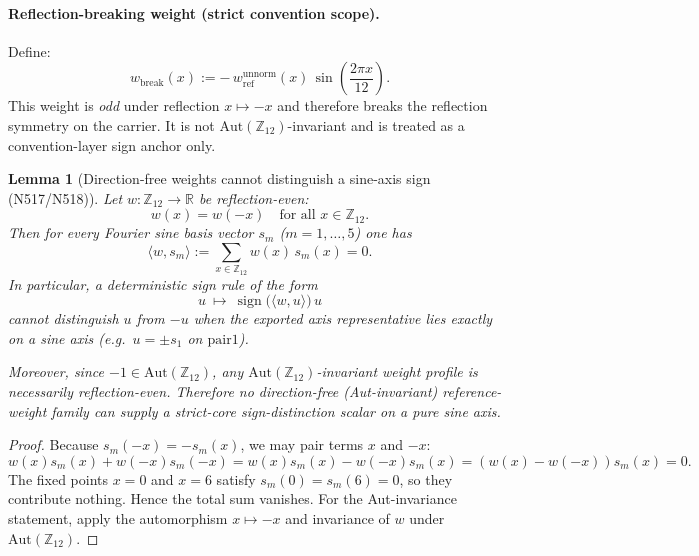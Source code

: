 \documentclass[11pt,a4paper]{article}
\newtheorem{lemma}[theorem]{Lemma}
\begin{document}
\paragraph{Reflection-breaking weight (strict convention scope).}
Define:
\[
w_{\mathrm{break}}(x)
:=
-\,w_{\mathrm{ref}}^{\mathrm{unnorm}}(x)\,\sin\!\left(\frac{2\pi x}{12}\right).
\]
This weight is \emph{odd} under reflection $x\mapsto -x$ and therefore breaks the reflection symmetry on the carrier.
It is not $\mathrm{Aut}(\mathbb{Z}_{12})$-invariant and is treated as a convention-layer sign anchor only.

\begin{lemma}[Direction-free weights cannot distinguish a sine-axis sign (N517/N518)]
\label{lem:even_weights_cannot_fix_sine_sign}
Let $w:\mathbb{Z}_{12}\to\mathbb{R}$ be \emph{reflection-even}:
\[
w(x)=w(-x)\quad\text{for all }x\in\mathbb{Z}_{12}.
\]
Then for every Fourier sine basis vector $s_m$ ($m=1,\dots,5$) one has
\[
\langle w, s_m\rangle := \sum_{x\in\mathbb{Z}_{12}} w(x)\,s_m(x) = 0.
\]
In particular, a deterministic sign rule of the form
\[
u\ \mapsto\ \operatorname{sign}\!\bigl(\langle w,u\rangle\bigr)\,u
\]
cannot distinguish $u$ from $-u$ when the exported axis representative lies exactly on a sine axis (e.g.\ $u=\pm s_1$ on $\mathrm{pair1}$).

Moreover, since $-1\in \mathrm{Aut}(\mathbb{Z}_{12})$, any $\mathrm{Aut}(\mathbb{Z}_{12})$-invariant weight profile is necessarily reflection-even.
Therefore no direction-free (Aut-invariant) reference-weight family can supply a strict-core sign-distinction scalar on a pure sine axis.
\end{lemma}

\begin{proof}
Because $s_m(-x)=-s_m(x)$, we may pair terms $x$ and $-x$:
\[
w(x)s_m(x)+w(-x)s_m(-x)=w(x)s_m(x)-w(-x)s_m(x)=(w(x)-w(-x))s_m(x)=0.
\]
The fixed points $x=0$ and $x=6$ satisfy $s_m(0)=s_m(6)=0$, so they contribute nothing. Hence the total sum vanishes.
For the Aut-invariance statement, apply the automorphism $x\mapsto -x$ and invariance of $w$ under $\mathrm{Aut}(\mathbb{Z}_{12})$.
\end{proof}
\end{document}
